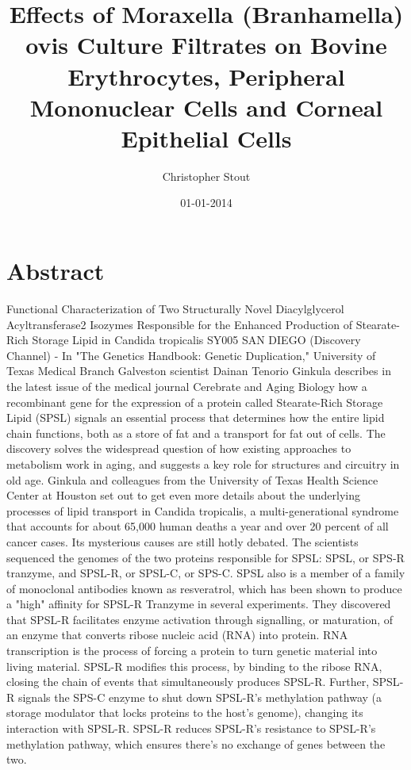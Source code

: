 \documentclass{article}%
\title{Effects of Moraxella (Branhamella) ovis Culture Filtrates on Bovine Erythrocytes, Peripheral Mononuclear Cells and Corneal Epithelial Cells}%
\author{Christopher Stout}%
\affil{Department of Traditional Chinese Medicine, Peking Union Medical College Hospital (PUMCH), Peking Union Medical College (PUMC), Chinese Academy of Medical Sciences, Beijing 100730, China}%
\date{01{-}01{-}2014}%
\begin{document}
%
\normalsize%
\maketitle%
\section{Abstract}%
\label{sec:Abstract}%
Functional Characterization of Two Structurally Novel Diacylglycerol Acyltransferase2 Isozymes Responsible for the Enhanced Production of Stearate{-}Rich Storage Lipid in Candida tropicalis SY005\newline%
SAN DIEGO (Discovery Channel) {-} In "The Genetics Handbook: Genetic Duplication," University of Texas Medical Branch Galveston scientist Dainan Tenorio Ginkula describes in the latest issue of the medical journal Cerebrate and Aging Biology how a recombinant gene for the expression of a protein called Stearate{-}Rich Storage Lipid (SPSL) signals an essential process that determines how the entire lipid chain functions, both as a store of fat and a transport for fat out of cells. The discovery solves the widespread question of how existing approaches to metabolism work in aging, and suggests a key role for structures and circuitry in old age.\newline%
Ginkula and colleagues from the University of Texas Health Science Center at Houston set out to get even more details about the underlying processes of lipid transport in Candida tropicalis, a multi{-}generational syndrome that accounts for about 65,000 human deaths a year and over 20 percent of all cancer cases. Its mysterious causes are still hotly debated.\newline%
The scientists sequenced the genomes of the two proteins responsible for SPSL: SPSL, or SPS{-}R tranzyme, and SPSL{-}R, or SPSL{-}C, or SPS{-}C. SPSL also is a member of a family of monoclonal antibodies known as resveratrol, which has been shown to produce a "high" affinity for SPSL{-}R Tranzyme in several experiments.\newline%
They discovered that SPSL{-}R facilitates enzyme activation through signalling, or maturation, of an enzyme that converts ribose nucleic acid (RNA) into protein. RNA transcription is the process of forcing a protein to turn genetic material into living material. SPSL{-}R modifies this process, by binding to the ribose RNA, closing the chain of events that simultaneously produces SPSL{-}R.\newline%
Further, SPSL{-}R signals the SPS{-}C enzyme to shut down SPSL{-}R's methylation pathway (a storage modulator that locks proteins to the host's genome), changing its interaction with SPSL{-}R. SPSL{-}R reduces SPSL{-}R's resistance to SPSL{-}R's methylation pathway, which ensures there's no exchange of genes between the two.\newline%
\end{document}

